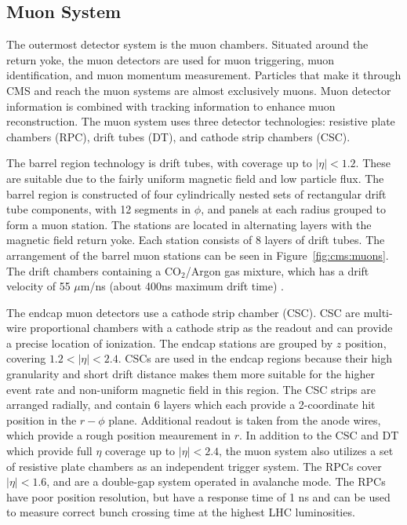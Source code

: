 \subsection{Muon System}\label{ch:cms:muons}
The outermost detector system is the muon chambers. Situated around the return yoke, the muon detectors are used for muon triggering, muon identification, and muon momentum measurement. Particles that make it through CMS and reach the muon systems are almost exclusively muons. Muon detector information is combined with tracking information to enhance muon reconstruction.
The muon system uses three detector technologies: resistive plate chambers (RPC), drift tubes (DT), and cathode strip chambers (CSC)\cite{CMS:1997iti}. 

The barrel region technology is drift tubes, with coverage up to $|\eta| < 1.2$. These are suitable due to the fairly uniform magnetic field and low particle flux. The barrel region is constructed of four cylindrically nested sets of rectangular drift tube components, with 12 segments in $\phi$, and panels at each radius grouped to form a muon station. The stations are located in alternating layers with the magnetic field return yoke. Each station consists of 8 layers of drift tubes. The arrangement of the barrel muon stations can be seen in Figure~\ref{fig:cms:muons}. The drift chambers containing a $\mathrm{CO_2}$/Argon gas mixture, which has a drift velocity of 55 $\mu$m/ns (about 400ns maximum drift time) \cite{Chatrchyan:2013sba}.



The endcap muon detectors use a cathode strip chamber (CSC). CSC are multi-wire proportional chambers with a cathode strip as the readout and can provide a precise location of ionization. The endcap stations are grouped by $z$ position, covering $1.2 < |\eta| < 2.4$. CSCs are used in the endcap regions because their high granularity and short drift distance makes them more suitable for the higher event rate and non-uniform magnetic field in this region. The CSC strips are arranged radially, and contain 6 layers which each provide a 2-coordinate hit position in the $r-\phi$ plane. Additional readout is taken from the anode wires, which provide a rough position meaurement in $r$.
In addition to the CSC and DT which provide full $\eta$ coverage up to $|\eta| < 2.4$, the muon system also utilizes a set of resistive plate chambers as an independent trigger system. The RPCs cover $|\eta| < 1.6$, and are a double-gap system operated in avalanche mode. The RPCs have poor position resolution, but have a response time of 1 ns and can be used to measure correct bunch crossing time at the highest LHC luminosities. 
